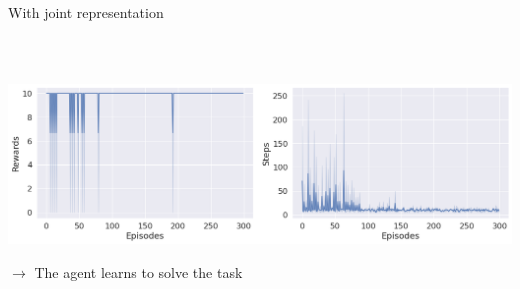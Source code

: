\documentclass[bigger]{beamer}
\begin{document}
\begin{frame}[label={sec:orgb3bc871}]{With joint representation}
\begin{columns}
\begin{column}{0.5\columnwidth}
\begin{center}
\end{center}
\end{column}
\end{columns}
\begin{block}{~}
\vspace{-2em}
\begin{center}
\includegraphics[height=0.4\textheight]{img/rewards-steps-allo-joint-repr.png}
\end{center}
\(\to\) The agent learns to solve the task
\end{block}
\end{frame}
\end{document}
